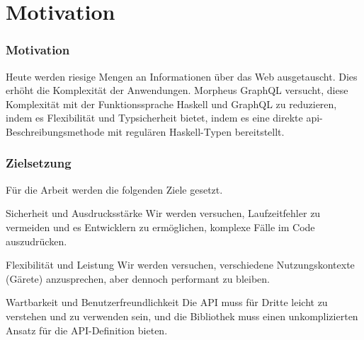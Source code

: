 
\section{Motivation}

\begin{frame}{}
    \frametitle{Motivation}

    Heute werden riesige Mengen an Informationen über das Web ausgetauscht. Dies erhöht die Komplexität der Anwendungen. Morpheus GraphQL versucht, diese Komplexität mit der Funktionssprache Haskell und GraphQL zu reduzieren, indem es Flexibilität und Typsicherheit bietet, indem es eine direkte api-Beschreibungsmethode mit regulären Haskell-Typen bereitstellt. 

\end{frame}

\begin{frame}
    \frametitle{Zielsetzung}

    Für die Arbeit werden die folgenden Ziele gesetzt.    



        \footnotesize

        \begin{block}{Sicherheit und Ausdrucksstärke}
            Wir werden versuchen, Laufzeitfehler zu vermeiden und es Entwicklern zu ermöglichen, komplexe Fälle im Code auszudrücken.
        \end{block}

        \begin{block}{Flexibilität und Leistung} 
            Wir werden  versuchen, verschiedene Nutzungskontexte (Gärete) anzusprechen, aber dennoch performant zu bleiben. 
        \end{block}

        \begin{block}{Wartbarkeit und Benutzerfreundlichkeit} 
            Die API muss für Dritte leicht zu verstehen und zu verwenden sein, und die Bibliothek muss einen unkomplizierten Ansatz für die API-Definition bieten. 
        \end{block}
\end{frame}

